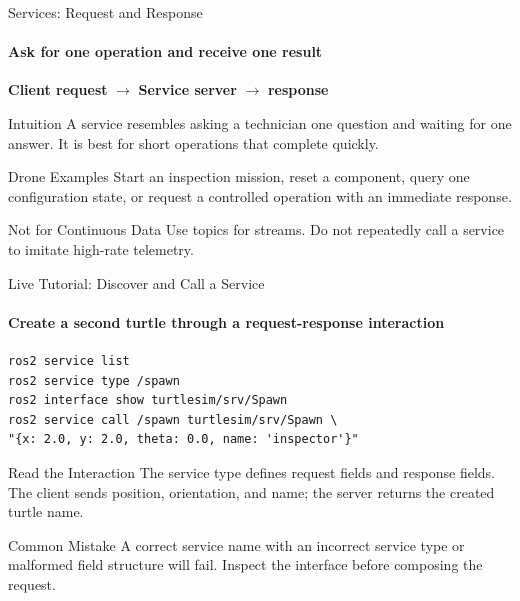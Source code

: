 \begin{frame}{Services: Request and Response}
\framesubtitle{Ask for one operation and receive one result}
\begin{center}
\textbf{Client request} $\longrightarrow$ \textbf{Service server} $\longrightarrow$ \textbf{response}
\end{center}
\begin{block}{Intuition}
A service resembles asking a technician one question and waiting for one answer. It is best for short operations that complete quickly.
\end{block}
\begin{exampleblock}{Drone Examples}
Start an inspection mission, reset a component, query one configuration state, or request a controlled operation with an immediate response.
\end{exampleblock}
\begin{alertblock}{Not for Continuous Data}
Use topics for streams. Do not repeatedly call a service to imitate high-rate telemetry.
\end{alertblock}
\end{frame}

\begin{frame}[fragile]{Live Tutorial: Discover and Call a Service}
\framesubtitle{Create a second turtle through a request-response interaction}
\scriptsize
\begin{verbatim}
ros2 service list
ros2 service type /spawn
ros2 interface show turtlesim/srv/Spawn
ros2 service call /spawn turtlesim/srv/Spawn \
"{x: 2.0, y: 2.0, theta: 0.0, name: 'inspector'}"
\end{verbatim}
\begin{exampleblock}{Read the Interaction}
The service type defines request fields and response fields. The client sends position, orientation, and name; the server returns the created turtle name.
\end{exampleblock}
\begin{alertblock}{Common Mistake}
A correct service name with an incorrect service type or malformed field structure will fail. Inspect the interface before composing the request.
\end{alertblock}
\end{frame}

